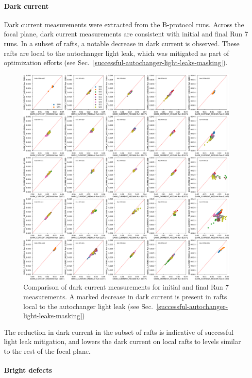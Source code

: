 \paragraph{Dark current}\label{dark-current}

Dark current measurements were extracted from the B-protocol runs. Across the focal plane, dark current measurements are consistent with initial and final Run 7 runs. In a subset of rafts, a notable decrease in dark current is observed. These rafts are local to the autochanger light leak, which was mitigated as part of optimization efforts (see Sec.~\ref{successful-autochanger-light-leaks-masking}).

\begin{figure}[H]
    \centering
    \includegraphics[width=0.7\linewidth]{figures/finalCharacterization/E1071_E1880_DARK_CURRENT_MEDIAN.png}
    \caption{Comparison of dark current measurements for initial and final Run 7 measurements. A marked decrease in dark current is present in rafts local to the autochanger light leak (see Sec.~\ref{successful-autochanger-light-leaks-masking})}
    \label{fig:finalChar-DarkCurrent-5x5}
\end{figure}

The reduction in dark current in the subset of rafts is indicative of successful light leak mitigation, and lowers the dark current on local rafts to levels similar to the rest of the focal plane.

\paragraph{Bright defects}\label{final-bright-defects}

